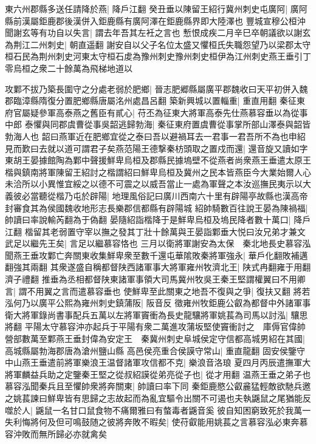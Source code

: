 東六州郡縣多送任請降於燕|{
	降戶江翻}
癸丑垂以陳留王紹行冀州刺史屯廣阿|{
	廣阿縣前漢屬鉅鹿郡後漢併入鉅鹿縣有廣阿澤在鉅鹿縣界即大陸澤也}
豐城宣穆公桓沖聞謝玄等有功自以失言|{
	謂去年吾其左衽之言也}
慙恨成疾二月辛巳卒朝議欲以謝玄為荆江二州刺史|{
	朝直遥翻}
謝安自以父子名位太盛又懼桓氏失職怨望乃以梁郡太守桓石民為荆州刺史河東太守桓石䖍為豫州刺史豫州刺史桓伊為江州刺史燕王垂引丁零烏桓之衆二十餘萬為飛梯地道以

攻鄴不拔乃築長圍守之分處老弱於肥鄉|{
	晉志肥郷縣屬廣平郡魏收曰天平初併入魏郡臨漳縣隋復分置肥鄉縣唐屬洺州處昌呂翻}
築新興城以置輜重|{
	重直用翻}
秦征東府官屬疑參軍高泰燕之舊臣有貳心|{
	苻丕為征東大將軍高泰先仕燕慕容垂以為從事中郎}
泰懼與同郡虞曹從事吳韶逃歸勃海|{
	秦征東府置虞曹從事掌所部山澤泰與韶皆勃海人也}
韶曰燕軍近在肥鄉宜從之泰曰吾以避禍耳去一君事一君吾所不為也申紹見而歎曰去就以道可謂君子矣燕范陽王德撃秦枋頭取之置戍而還|{
	還音旋又讀如字}
東胡王晏據館陶為鄴中聲援鮮卑烏桓及郡縣民據塢壁不從燕者尚衆燕王垂遣太原王楷與鎮南將軍陳留王紹討之楷謂紹曰鮮卑烏桓及冀州之民本皆燕臣今大業始爾人心未洽所以小異惟宜綏之以德不可震之以威吾當止一處為軍聲之本汝巡撫民夷示以大義彼必當聽從楷乃屯於辟陽|{
	地理風俗記曰廣川西南六十里有辟陽亭故縣也漢高帝封審食其為侯國魏收地形志長樂郡信都縣有辟陽城}
紹帥騎數百往說王晏為陳禍福|{
	帥讀曰率說輸芮翻為于偽翻}
晏隨紹詣楷降于是鮮卑烏桓及塢民降者數十萬口|{
	降戶江翻}
楷留其老弱置守宰以撫之發其丁壯十餘萬與王晏詣鄴垂大悦曰汝兄弟才兼文武足以繼先王矣|{
	言足以繼慕容恪也}
三月以衛將軍謝安為太保　秦北地長史慕容泓聞燕王垂攻鄴亡奔關東收集鮮卑衆至數千還屯華隂敗秦將軍強永|{
	華戶化翻敗補邁翻強其兩翻}
其衆遂盛自稱都督陕西諸軍事大將軍雍州牧濟北王|{
	陕式冉翻雍于用翻濟子禮翻}
推垂為丞相都督陕東諸軍事領大司馬冀州牧吳王秦王堅謂權翼曰不用卿言|{
	謂不用翼之言而遣慕容垂也}
使鮮卑至此關東之地吾不復與之爭|{
	復扶又翻}
將若泓何乃以廣平公熙為雍州刺史鎮蒲阪|{
	阪音反}
徵雍州牧鉅鹿公叡為都督中外諸軍事衛大將軍錄尚書事配兵五萬以左將軍竇衝為長史龍驤將軍姚萇為司馬以討泓|{
	驤思將翻}
平陽太守慕容沖亦起兵于平陽有衆二萬進攻蒲坂堅使竇衝討之　庫傉官偉帥營部數萬至鄴燕王垂封偉為安定王　秦冀州刺史阜城侯定守信都高城男紹在其國|{
	高城縣屬勃海郡唐為滄州鹽山縣}
高邑侯亮重合侯謨守常山|{
	重直龍翻}
固安侯鑒守中山燕王垂遣前將軍樂浪王温督諸軍攻信都不克|{
	樂浪音洛琅}
夏四月丙辰遣撫軍大將軍麟益兵助之定鑒秦王堅之從叔紹謨從弟亮從子也|{
	從才用翻}
温燕王垂之弟子也　慕容泓聞秦兵且至懼帥衆將奔關東|{
	帥讀曰率下同}
秦鉅鹿愍公叡麄猛輕敵欲馳兵邀之姚萇諫曰鮮卑皆有思歸之志故起而為亂宜驅令出關不可遏也夫執鼷鼠之尾猶能反噬於人|{
	鼷鼠一名甘口鼠食物不痛爾雅曰有螫毒者鼷音奚}
彼自知困窮致死於我萬一失利悔將何及但可鳴鼓随之彼將奔敗不暇矣|{
	使苻叡能用姚萇之言慕容泓必東奔慕容沖敗而無所歸必亦就禽矣}
